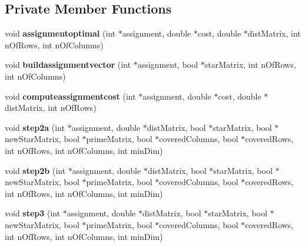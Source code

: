 \subsection*{Private Member Functions}
\begin{DoxyCompactItemize}
\item 
\mbox{\label{classKMAlgorithm_ab052c84e37a1718ff77efcf8c73b1aaa}} 
void {\bfseries assignmentoptimal} (int $\ast$assignment, double $\ast$cost, double $\ast$dist\+Matrix, int n\+Of\+Rows, int n\+Of\+Columns)
\item 
\mbox{\label{classKMAlgorithm_a65cf4a8827f73f8b6efd87f08c695443}} 
void {\bfseries buildassignmentvector} (int $\ast$assignment, bool $\ast$star\+Matrix, int n\+Of\+Rows, int n\+Of\+Columns)
\item 
\mbox{\label{classKMAlgorithm_a4f804a85943ca454c5fc3c52d989e475}} 
void {\bfseries computeassignmentcost} (int $\ast$assignment, double $\ast$cost, double $\ast$dist\+Matrix, int n\+Of\+Rows)
\item 
\mbox{\label{classKMAlgorithm_a7a8094d5f536fcedc18b2fd7de4c8554}} 
void {\bfseries step2a} (int $\ast$assignment, double $\ast$dist\+Matrix, bool $\ast$star\+Matrix, bool $\ast$new\+Star\+Matrix, bool $\ast$prime\+Matrix, bool $\ast$covered\+Columns, bool $\ast$covered\+Rows, int n\+Of\+Rows, int n\+Of\+Columns, int min\+Dim)
\item 
\mbox{\label{classKMAlgorithm_a40807f82459a267ac8e047aa019e029a}} 
void {\bfseries step2b} (int $\ast$assignment, double $\ast$dist\+Matrix, bool $\ast$star\+Matrix, bool $\ast$new\+Star\+Matrix, bool $\ast$prime\+Matrix, bool $\ast$covered\+Columns, bool $\ast$covered\+Rows, int n\+Of\+Rows, int n\+Of\+Columns, int min\+Dim)
\item 
\mbox{\label{classKMAlgorithm_aa975ef4957ebe06318ffc532b9650e30}} 
void {\bfseries step3} (int $\ast$assignment, double $\ast$dist\+Matrix, bool $\ast$star\+Matrix, bool $\ast$new\+Star\+Matrix, bool $\ast$prime\+Matrix, bool $\ast$covered\+Columns, bool $\ast$covered\+Rows, int n\+Of\+Rows, int n\+Of\+Columns, int min\+Dim)
\item 
\mbox{\label{classKMAlgorithm_af94b9ff53cef10a76b02f3a59aef9c42}} 

\end{DoxyCompactItemize}
